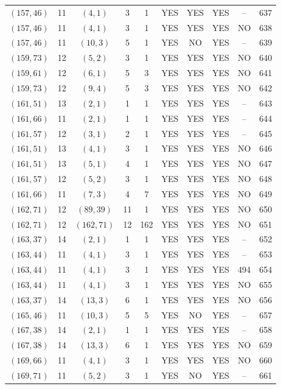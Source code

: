 \begin{longtable}{|c|c|c|c|c|c|c|c|c|c|}
$(157, 46)$ & 11 & $(4, 1)$ & 3 & 1 & YES & YES & YES & -- & 637\\
$(157, 46)$ & 11 & $(4, 1)$ & 3 & 1 & YES & YES & YES & NO & 638\\
$(157, 46)$ & 11 & $(10, 3)$ & 5 & 1 & YES & NO & YES & -- & 639\\
$(159, 73)$ & 12 & $(5, 2)$ & 3 & 1 & YES & YES & YES & NO & 640\\
$(159, 61)$ & 12 & $(6, 1)$ & 5 & 3 & YES & YES & YES & NO & 641\\
$(159, 73)$ & 12 & $(9, 4)$ & 5 & 3 & YES & YES & YES & NO & 642\\
$(161, 51)$ & 13 & $(2, 1)$ & 1 & 1 & YES & YES & YES & -- & 643\\
$(161, 66)$ & 11 & $(2, 1)$ & 1 & 1 & YES & YES & YES & -- & 644\\
$(161, 57)$ & 12 & $(3, 1)$ & 2 & 1 & YES & YES & YES & -- & 645\\
$(161, 51)$ & 13 & $(4, 1)$ & 3 & 1 & YES & YES & YES & NO & 646\\
$(161, 51)$ & 13 & $(5, 1)$ & 4 & 1 & YES & YES & YES & NO & 647\\
$(161, 57)$ & 12 & $(5, 2)$ & 3 & 1 & YES & YES & YES & NO & 648\\
$(161, 66)$ & 11 & $(7, 3)$ & 4 & 7 & YES & YES & YES & NO & 649\\
$(162, 71)$ & 12 & $(89, 39)$ & 11 & 1 & YES & YES & YES & NO & 650\\
$(162, 71)$ & 12 & $(162, 71)$ & 12 & 162 & YES & YES & YES & NO & 651\\
$(163, 37)$ & 14 & $(2, 1)$ & 1 & 1 & YES & YES & YES & -- & 652\\
$(163, 44)$ & 11 & $(4, 1)$ & 3 & 1 & YES & YES & YES & -- & 653\\
$(163, 44)$ & 11 & $(4, 1)$ & 3 & 1 & YES & YES & YES & 494 & 654\\
$(163, 44)$ & 11 & $(4, 1)$ & 3 & 1 & YES & YES & YES & NO & 655\\
$(163, 37)$ & 14 & $(13, 3)$ & 6 & 1 & YES & YES & YES & NO & 656\\
$(165, 46)$ & 11 & $(10, 3)$ & 5 & 5 & YES & NO & YES & -- & 657\\
$(167, 38)$ & 14 & $(2, 1)$ & 1 & 1 & YES & YES & YES & -- & 658\\
$(167, 38)$ & 14 & $(13, 3)$ & 6 & 1 & YES & YES & YES & NO & 659\\
$(169, 66)$ & 11 & $(4, 1)$ & 3 & 1 & YES & YES & YES & NO & 660\\
$(169, 71)$ & 11 & $(5, 2)$ & 3 & 1 & YES & NO & YES & -- & 661\\

\end{longtable}
